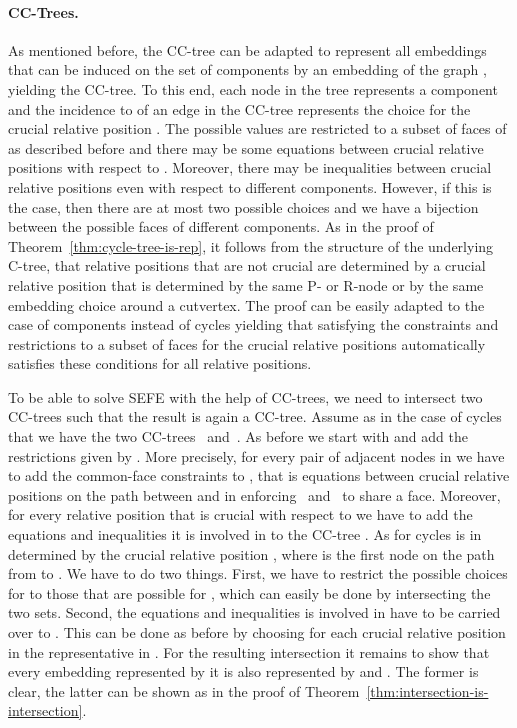 \documentclass{scrartcl}
\newcommand{\1}[1]{{\normalfont \ensuremath{#1^{\tiny\circled{1}}}}} \newcommand{\2}[1]{{\normalfont \ensuremath{#1^{\tiny\circled{2}}}}} \renewcommand{\k}[1]{{\normalfont \ensuremath{#1^{\tiny\circled{k}}}}} \newcommand{\proj}[2]{\ensuremath{\left.#1\right|_{#2}}} \newcommand{\eps}{\varepsilon}
\theoremstyle{plain} \newtheorem{theorem}{Theorem} \newcounter{lemmacounter} \setcounter{lemmacounter}{0} \newtheorem{lemma}[lemmacounter]{Lemma} \newtheorem{fact}{Fact}  \newtheorem{corollary}{Corollary} \theoremstyle{definition} \newtheorem{definition}{Definition}
\begin{document}
\paragraph{CC-Trees.}
\label{sec:cc-trees-ext}

As mentioned before, the CC-tree can be adapted to represent all
embeddings that can be induced on the set of components 
by an embedding of the graph , yielding the CC-tree.  To
this end, each node in the tree represents a component  and the incidence to  of an edge  in the
CC-tree represents the choice for the crucial relative
position .  The possible values are restricted to a subset
of faces of  as described before and there may be some equations
between crucial relative positions with respect to .  Moreover,
there may be inequalities between crucial relative positions even with
respect to different components.  However, if this is the case, then
there are at most two possible choices and we have a bijection between
the possible faces of different components.  As in the proof of
Theorem~\ref{thm:cycle-tree-is-rep}, it follows from the structure of
the underlying C-tree, that relative positions that are not crucial
are determined by a crucial relative position that is determined by
the same P- or R-node or by the same embedding choice around a
cutvertex.  The proof can be easily adapted to the case of components
instead of cycles yielding that satisfying the constraints and
restrictions to a subset of faces for the crucial relative positions
automatically satisfies these conditions for all relative positions.

To be able to solve {\sc SEFE} with the help of CC-trees, we need to
intersect two CC-trees such that the result is again a CC-tree.
Assume as in the case of cycles that we have the two
CC-trees~ and~.  As before we
start with  and add the restrictions given by
.  More precisely, for every pair  of
adjacent nodes in  we have to add the common-face
constraints to , that is equations between crucial
relative positions on the path between  and  in  enforcing~ and~ to share a face.  Moreover, for every
relative position  that is crucial with respect to
 we have to add the equations and inequalities it is
involved in to the CC-tree .  As for cycles
 is in  determined by the crucial
relative position , where  is the first node on the
path from  to .  We have to do two things.  First, we have to
restrict the possible choices for  to those that are
possible for , which can easily be done by intersecting
the two sets.  Second, the equations and inequalities  is
involved in have to be carried over to .  This can be
done as before by choosing for each crucial relative position in
 the representative in .  For the
resulting intersection  it remains to show that every
embedding represented by it is also represented by 
and .  The former is clear, the latter can be shown
as in the proof of Theorem~\ref{thm:intersection-is-intersection}.
\end{document}
